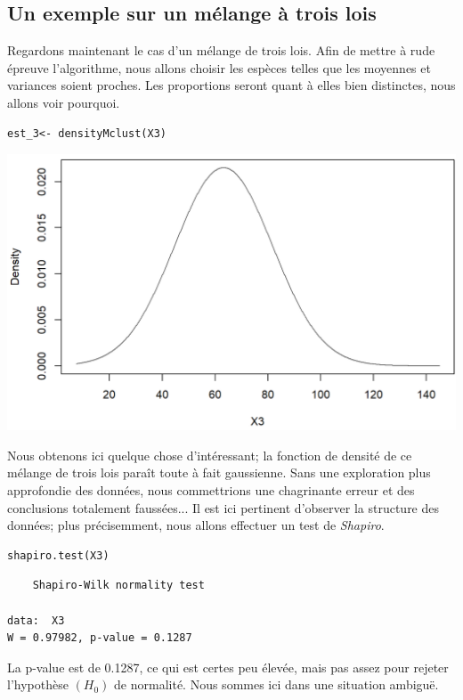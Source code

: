\documentclass[frenchb]{report}
\newcommand{\1}{\mathbbm{1}}
\theoremstyle{definition}\newtheorem{defn}{Définition}
\theoremstyle{definition}\newtheorem{exm}{Exemple}
\theoremstyle{definition}\newtheorem{nota}{Notation}
\theoremstyle{definition}\newtheorem{rem}{Remarque}
\begin{document}
\begin{appendices}
\section{Un exemple sur un mélange à trois lois}
Regardons maintenant le cas d'un mélange de trois lois. Afin de mettre à rude épreuve l'algorithme, nous allons choisir les espèces telles que les moyennes et variances soient proches. Les proportions seront quant à elles bien distinctes, nous allons voir pourquoi.
%
\begin{lstlisting}
est_3<- densityMclust(X3)
\end{lstlisting}
\begin{center}\includegraphics[scale=0.75]{fig2.png}\end{center}
Nous obtenons ici quelque chose d'intéressant; la fonction de densité de ce mélange de trois lois paraît toute à fait gaussienne. Sans une exploration plus approfondie des données, nous commettrions une chagrinante erreur et des conclusions totalement faussées... \newline
%
Il est ici pertinent d'observer la structure des données; plus précisemment, nous allons effectuer un test de \textit{Shapiro}.
\begin{lstlisting}
shapiro.test(X3)
\end{lstlisting}

\begin{verbatim}
	Shapiro-Wilk normality test

data:  X3
W = 0.97982, p-value = 0.1287
\end{verbatim}
La p-value est de 0.1287, ce qui est certes peu élevée, mais pas assez pour rejeter l'hypothèse $(H_0)$ de normalité. Nous sommes ici dans une situation ambiguë.\newline
%


\end{appendices}
\end{document}
